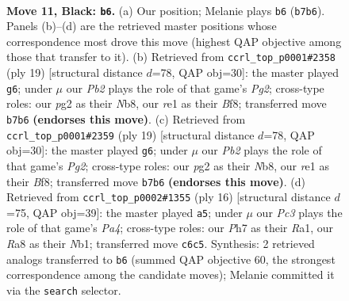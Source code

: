 \documentclass[11pt]{article}
\begin{document}
\clearpage

\begin{figure}[p]\centering
\begin{subfigure}{0.46\textwidth}\centering
\resizebox{\linewidth}{!}{%
\newchessgame
\chessboard[
  setfen={rnb1r2k/pp1nqppp/2p1p3/3pP3/3P4/2N5/PPPQ1PPP/2K1RBNR b - - 1 11},
  showmover=false,
  pgfstyle=straightmove, color=movearrow, markmove={b7-b6}
]}
\caption{}
\end{subfigure}\hfill
\begin{subfigure}{0.46\textwidth}\centering
\resizebox{\linewidth}{!}{%
\newchessgame
\chessboard[
  setfen={rn1qkb1r/1p3pp1/p2p1n2/3Pp2p/8/1N2BP2/PPP3PP/R2QKB1R b KQkq - 0 10},
  showmover=false,
  pgfstyle=straightmove, color=movearrow, markmove={g7-g6}
]}
\caption{}
\end{subfigure}
\\[4pt]
\begin{subfigure}{0.46\textwidth}\centering
\resizebox{\linewidth}{!}{%
\newchessgame
\chessboard[
  setfen={rn1qkb1r/1p3pp1/p2p1n2/3Pp2p/8/1N2BP2/PPP3PP/R2QKB1R b KQkq - 0 10},
  showmover=false,
  pgfstyle=straightmove, color=movearrow, markmove={g7-g6}
]}
\caption{}
\end{subfigure}\hfill
\begin{subfigure}{0.46\textwidth}\centering
\resizebox{\linewidth}{!}{%
\newchessgame
\chessboard[
  setfen={r1b1k2r/pp2qpbp/2p2np1/2p1p3/P3P3/3P1N2/1PP2PPP/RNBQR1K1 w kq - 1 9},
  showmover=false,
  pgfstyle=straightmove, color=movearrow, markmove={a4-a5}
]}
\caption{}
\end{subfigure}
\caption{\textbf{Move 11, Black: \texttt{b6}.} (a) Our position; Melanie plays \texttt{b6} (\texttt{b7b6}). Panels (b)--(d) are the retrieved master positions whose correspondence most drove this move (highest QAP objective among those that transfer to it). (b) Retrieved from \texttt{ccrl\_top\_p0001\#2358} (ply 19) [structural distance $d$=78, QAP obj=30]: the master played \texttt{g6}; under $\mu$ our \emph{Pb2} plays the role of that game's \emph{Pg2}; cross-type roles: our \emph{p}g2 as their \emph{N}b8, our \emph{r}e1 as their \emph{B}f8; transferred move \texttt{b7b6} \textbf{(endorses this move)}. (c) Retrieved from \texttt{ccrl\_top\_p0001\#2359} (ply 19) [structural distance $d$=78, QAP obj=30]: the master played \texttt{g6}; under $\mu$ our \emph{Pb2} plays the role of that game's \emph{Pg2}; cross-type roles: our \emph{p}g2 as their \emph{N}b8, our \emph{r}e1 as their \emph{B}f8; transferred move \texttt{b7b6} \textbf{(endorses this move)}. (d) Retrieved from \texttt{ccrl\_top\_p0002\#1355} (ply 16) [structural distance $d$=75, QAP obj=39]: the master played \texttt{a5}; under $\mu$ our \emph{Pc3} plays the role of that game's \emph{Pa4}; cross-type roles: our \emph{P}h7 as their \emph{R}a1, our \emph{R}a8 as their \emph{N}b1; transferred move \texttt{c6c5}. Synthesis: 2 retrieved analogs transferred to \texttt{b6} (summed QAP objective 60, the strongest correspondence among the candidate moves); Melanie committed it via the \texttt{search} selector.}
\label{fig:thought-m21}
\end{figure}
\end{document}
